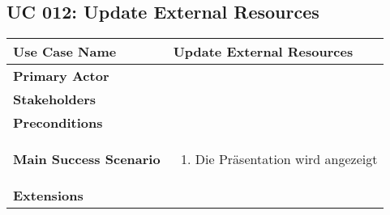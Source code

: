 \subsection{UC 012: Update External Resources}
\label{uc:012-update-external-res}

\begin{tabular}{|l|p{}|}
\hline
\textbf{Use Case Name} 	&	Update External Resources	\\ \hline
\textbf{Primary Actor} 	&		\\ \hline
\textbf{Stakeholders}	&		\\ \hline
\textbf{Preconditions}	&		\\ \hline
\textbf{Main Success Scenario}	&
\begin{enumerate}
	\item Die Präsentation wird angezeigt
\end{enumerate}
\\ \hline
\textbf{Extensions}	& 	\\ \hline
\end{tabular}